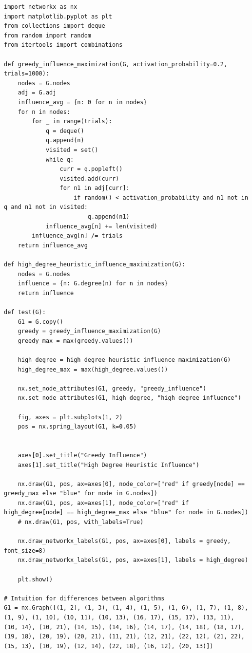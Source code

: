 \documentclass{article}
\begin{document}
\begin{verbatim}
import networkx as nx
import matplotlib.pyplot as plt
from collections import deque
from random import random
from itertools import combinations

def greedy_influence_maximization(G, activation_probability=0.2, trials=1000):
    nodes = G.nodes
    adj = G.adj
    influence_avg = {n: 0 for n in nodes}
    for n in nodes:
        for _ in range(trials):
            q = deque()
            q.append(n)
            visited = set()
            while q:
                curr = q.popleft()
                visited.add(curr)
                for n1 in adj[curr]:
                    if random() < activation_probability and n1 not in q and n1 not in visited:
                        q.append(n1)
            influence_avg[n] += len(visited)
        influence_avg[n] /= trials
    return influence_avg

def high_degree_heuristic_influence_maximization(G):
    nodes = G.nodes
    influence = {n: G.degree(n) for n in nodes}
    return influence

def test(G):
    G1 = G.copy()
    greedy = greedy_influence_maximization(G)
    greedy_max = max(greedy.values())

    high_degree = high_degree_heuristic_influence_maximization(G)
    high_degree_max = max(high_degree.values())

    nx.set_node_attributes(G1, greedy, "greedy_influence")
    nx.set_node_attributes(G1, high_degree, "high_degree_influence")

    fig, axes = plt.subplots(1, 2)
    pos = nx.spring_layout(G1, k=0.05)


    axes[0].set_title("Greedy Influence")
    axes[1].set_title("High Degree Heuristic Influence")

    nx.draw(G1, pos, ax=axes[0], node_color=["red" if greedy[node] == greedy_max else "blue" for node in G.nodes])
    nx.draw(G1, pos, ax=axes[1], node_color=["red" if high_degree[node] == high_degree_max else "blue" for node in G.nodes])
    # nx.draw(G1, pos, with_labels=True)

    nx.draw_networkx_labels(G1, pos, ax=axes[0], labels = greedy, font_size=8)
    nx.draw_networkx_labels(G1, pos, ax=axes[1], labels = high_degree)

    plt.show()

# Intuition for differences between algorithms
G1 = nx.Graph([(1, 2), (1, 3), (1, 4), (1, 5), (1, 6), (1, 7), (1, 8), (1, 9), (1, 10), (10, 11), (10, 13), (16, 17), (15, 17), (13, 11), (10, 14), (10, 21), (14, 15), (14, 16), (14, 17), (14, 18), (18, 17), (19, 18), (20, 19), (20, 21), (11, 21), (12, 21), (22, 12), (21, 22), (15, 13), (10, 19), (12, 14), (22, 18), (16, 12), (20, 13)])


\end{verbatim}
\end{document}
